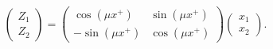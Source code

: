 \begin{equation}
\left( \begin{array}{c} Z_1 \\ Z_2  \end{array}  \right) = 
\left( \begin{array}{cc} \cos(\mu x^+)  & \sin(\mu x^+) \\
                         -\sin(\mu x^+) & \cos(\mu x^+) \end{array}  \right)
\left( \begin{array}{c} x_1 \\ x_2  \end{array}  \right).
\end{equation}

